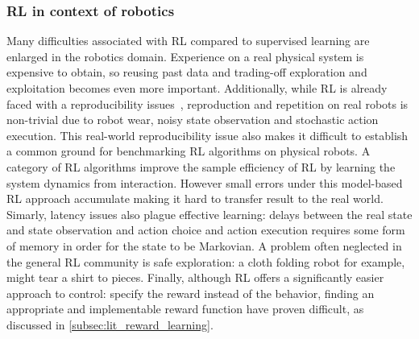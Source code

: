 \documentclass[\home/main.tex]{subfiles}
\begin{document}
\subsubsection{RL in context of robotics}
Many difficulties associated with RL compared to supervised learning are enlarged in the robotics domain.
Experience on a real physical system is expensive to obtain, so reusing past data and trading-off exploration and exploitation becomes even more important.
Additionally, while RL is already faced with a reproducibility issues~\autocite{henderson2018deep}, reproduction and repetition on real robots is non-trivial due to robot wear, noisy state observation and stochastic action execution. This real-world reproducibility issue also makes it difficult to establish a common ground for benchmarking RL algorithms on physical robots.
A category of RL algorithms improve the sample efficiency of RL by learning the system dynamics from interaction. However small errors under this model-based RL approach accumulate making it hard to transfer result to the real world.
Simarly, latency issues also plague effective learning: delays between the real state and state observation and action choice and action execution requires some form of memory in order for the state to be Markovian.
A problem often neglected in the general RL community is safe exploration: a cloth folding robot for example, might tear a shirt to pieces.
Finally, although RL offers a significantly easier approach to control: specify the reward instead of the behavior, finding an appropriate and implementable reward function have proven difficult, as discussed in \cref{subsec:lit_reward_learning}.

\end{document}
